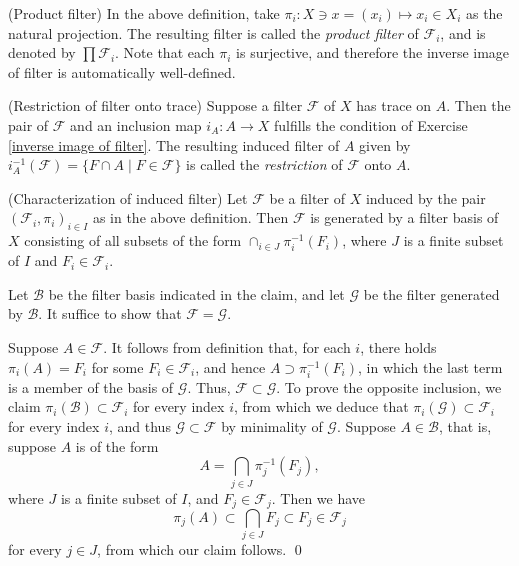 \documentclass{report}
\begin{document}
\begin{ex} (Product filter)
    In the above definition, take \( \pi_i :X \ni x = (x_i) \mapsto x_i \in X_i \) as the natural projection. The resulting filter is called the \textit{product filter} of \( \mathscr{F}_i \), and is denoted by \( \prod \mathscr{F}_i \). Note that each \( \pi_i \) is surjective, and therefore the inverse image of filter is automatically well-defined.
\end{ex}

\begin{ex} (Restriction of filter onto trace)
    Suppose a filter \( \mathscr{F} \) of \( X \) has trace on \( A \). Then the pair of \( \mathscr{F} \) and an inclusion map \( i_A:A \to X \) fulfills the condition of Exercise \ref{inverse image of filter}. The resulting induced filter of \( A \) given by \(i_A^{-1}(\mathscr{F}) =\{F \cap A \mid F \in \mathscr{F}\} \) is called the \textit{restriction} of \( \mathscr{F} \) onto \( A \).
\end{ex}

\begin{prp}\label{characterize induced filter} (Characterization of induced filter)
    Let \( \mathscr{F} \) be a filter of \( X \) induced by the pair \( (\mathscr{F}_i ,\pi_i)_{i \in I} \) as in the above definition. Then \( \mathscr{F} \) is generated by a filter basis of \( X \) consisting of all subsets of the form \( \cap_{i \in J} \pi_i ^{-1}(F_i)\), where \( J \) is a finite subset of \( I \) and \( F_i \in \mathscr{F}_i \).
\end{prp}
\begin{prf}
    Let \( \mathscr{B} \) be the filter basis indicated in the claim, and let \( \mathscr{G} \) be the filter generated by \( \mathscr{B} \). It suffice to show that \( \mathscr{F}=\mathscr{G} \).

    Suppose \( A \in \mathscr{F}\). It follows from definition that, for each \( i \), there holds \( \pi_i(A) = F_i \) for some \( F_i \in \mathscr{F}_i \), and hence \( A \supset \pi_i ^{-1}(F_i) \), in which the last term is a member of the basis of \( \mathscr{G} \). Thus, \( \mathscr{F} \subset \mathscr{G} \). To prove the opposite inclusion, we claim \( \pi_i(\mathscr{B})\subset \mathscr{F}_i \) for every index \( i \), from which we deduce that \( \pi_i(\mathscr{G})\subset \mathscr{F}_i \) for every index \( i \), and thus \( \mathscr{G} \subset \mathscr{F} \) by minimality of \( \mathscr{G} \). Suppose \( A \in \mathscr{B}\), that is, suppose \( A \) is of the form
    \[
        A = \bigcap_{j \in J} \pi_j^{-1}(F_j),
    \]
    where \( J \) is a finite subset of \( I \), and \( F_j \in \mathscr{F}_j \). Then we have
    \[
        \pi_j(A) \subset \bigcap_{j \in J}F_j \subset F_j \in \mathscr{F}_j
    \]
    for every \( j \in J \), from which our claim follows.
    \qed\end{prf}
\end{document}
